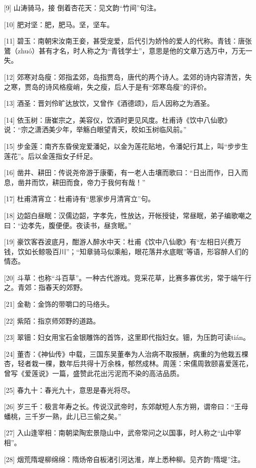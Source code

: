 \documentclass[12pt,UTF8]{ctexbook}
\begin{document}
[9] 山涛骑马，接 倒着杏花天：见文韵“竹间”句注。

[10] 肥对坚：肥，肥马。坚，坚车。

[11] 碧玉：南朝宋汝南王妾，甚受宠爱，后代引为娇怜的爱人的代称。青钱：唐张鷟（zhuó）甚有才名，时人称之为“青钱学士”，意思是他的文章万选万中，万无一失。

[12] 郊寒对岛瘦：郊指孟郊，岛指贾岛，唐代的两个诗人。孟郊的诗内容清苦，失之寒，贾岛的诗风格瘦峭，失之瘦，后人于是有“郊寒岛瘦”的评价。

[13] 酒圣：晋刘伶旷达放饮，又曾作《酒德颂》，后人因称之为酒圣。

[14] 依玉树：唐崔宗之，美容仪，饮酒时更见风度。杜甫诗《饮中八仙歌》说：“宗之潇洒美少年，举觞白眼望青天，皎如玉树临风前。”

[15] 步金莲：南齐东昏侯宠爱潘妃，以金为莲花贴地，令潘妃行其上，叫“步步生莲花”。后以金莲指女子纤足。

[16] 凿井、耕田：传说尧帝游于康衢，有一老人击壤而歌曰：“日出而作，日入而息，凿井而饮，耕田而食，帝力于我何有哉！”

[17] 杜甫清宵立：杜甫诗有“思家步月清宵立”句。

[18] 边韶白昼眠：汉儒边韶，字孝先，性放达，开帐授徒，常昼眠，弟子编歌嘲之曰：“边孝先，腹便便。夜读书，昼贪眠。”

[19] 豪饮客吞波底月，酣游人醉水中天：杜甫《饮中八仙歌》有“左相日兴费万钱，饮如长鲸吸百川”；“知章骑马似乘船，眼花落井水底眠”等语，形容醉人们的情态。

[20] 斗草：也称“斗百草”。一种古代游戏。竞采花草，比赛多寡优劣，常于端午行之。青郊：指春天的郊野。

[21] 金勒：金饰的带嚼口的马络头。

[22] 紫陌：指京师郊野的道路。

[23] 翠钿：妇女用宝石金银雕饰的首饰，这里即代指妇女。钿，为压韵可读tián。

[24] 董杏：《神仙传》中载，三国东吴董奉为人治病不取报酬，病重的为他栽五棵杏，轻者栽一棵，数年后共得十万余株，郁然成林。周莲：宋儒周敦颐喜爱莲花，曾写《爱莲说》一篇，盛赞此花出污泥而不染的高洁品质。

[25] 春九十：春光九十，意思是春光将尽。

[26] 岁三千：极言年寿之长。传说汉武帝时，东郊献短人东方朔，谓帝曰：“王母蟠桃，三千岁一熟，此儿已三偷之矣。”

[27] 入山逢宰相：南朝梁陶宏景隐山中，武帝常问之以国事，时人称之“山中宰相”。

[28] 烟荒隋堤柳绵绵：隋炀帝自板渚引河达淮，岸上悉种柳。见齐韵“隋堤”注。
\end{document}
